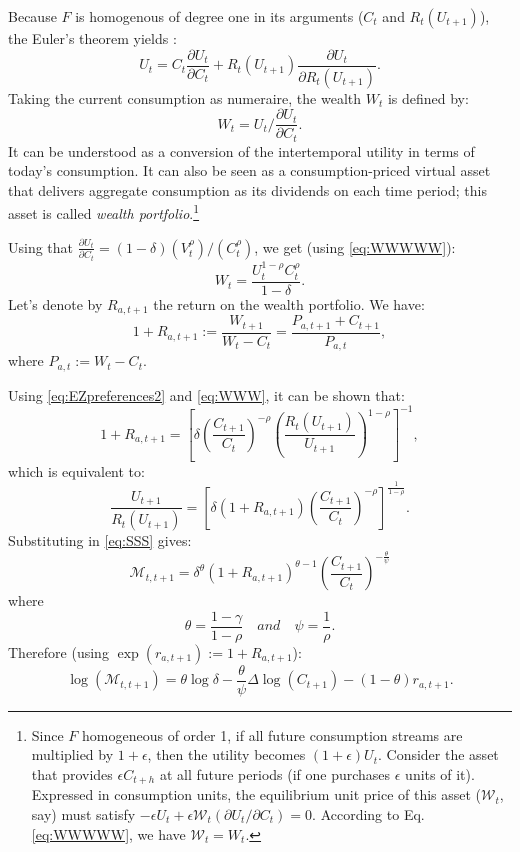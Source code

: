 \documentclass[
  12pt,
]{book}
\theoremstyle{definition}
\theoremstyle{definition}
\theoremstyle{definition}
\theoremstyle{definition}
\theoremstyle{remark}
\begin{document}
Because \(F\) is homogenous of degree one in its arguments (\(C_t\) and \(R_t(U_{t+1})\)), the Euler's theorem yields \citep{HANSEN20073967}:
\begin{equation}
U_t = C_t \frac{\partial U_t}{\partial C_t} +  R_t(U_{t+1}) \frac{\partial U_t}{\partial R_t(U_{t+1})}.\label{eq:XXYXX}
\end{equation}
Taking the current consumption as numeraire, the wealth \(W_t\) is defined by:
\begin{equation}
W_t =   U_t \big/ \frac{\partial U_t}{\partial C_t}.\label{eq:WWWWW}
\end{equation}
It can be understood as a conversion of the intertemporal utility in terms of today's consumption. It can also be seen as a consumption-priced virtual asset that delivers aggregate consumption as its dividends on each time period; this asset is called \emph{wealth portfolio}.\footnote{Since \(F\) homogeneous of order 1, if all future consumption streams are multiplied by \(1+\epsilon\), then the utility becomes \((1+\epsilon)U_t\). Consider the asset that provides \(\epsilon C_{t+h}\) at all future periods (if one purchases \(\epsilon\) units of it). Expressed in consumption units, the equilibrium unit price of this asset (\(\mathcal{W}_t\), say) must satisfy \(-\epsilon U_t + \epsilon \mathcal{W}_t (\partial U_t / \partial C_t)=0\). According to Eq. \eqref{eq:WWWWW}, we have \(\mathcal{W}_t = W_t\).}

Using that \(\frac{\partial U_t}{\partial C_t}=(1 - \delta)(V_t^\rho)/(C_t^{\rho})\), we get (using \eqref{eq:WWWWW}):
\begin{equation}
W_t = \frac{U_t^{1-\rho}C_t^\rho}{1 - \delta}.\label{eq:WWW}
\end{equation}
Let's denote by \(R_{a,t+1}\) the return on the wealth portfolio. We have:
\begin{equation}
1+R_{a,t+1} := \frac{W_{t+1}}{W_t - C_t} = \frac{P_{a,t+1}+C_{t+1}}{P_{a,t}},\label{eq:Ra}
\end{equation}
where \(P_{a,t} := W_t - C_t\).

Using \eqref{eq:EZpreferences2} and \eqref{eq:WWW}, it can be shown that:
\[
1+R_{a,t+1} = \left[ \delta \left( \frac{C_{t+1}}{C_t} \right)^{-\rho} \left( \frac{R_t(U_{t+1})}{U_{t+1}} \right)^{1-\rho} \right]^{-1},
\]
which is equivalent to:
\[
\frac{U_{t+1}}{R_t(U_{t+1})} = \left[ \delta (1+ R_{a,t+1}) \left( \frac{C_{t+1}}{C_t} \right)^{-\rho}  \right]^{\frac{1}{1-\rho}}.
\]
Substituting in \eqref{eq:SSS} gives:
\begin{equation}
\mathcal{M}_{t,t+1} =  \delta^{\theta} (1+R_{a,t+1})^{\theta - 1} \left( \frac{C_{t+1}}{C_t} \right)^{- \frac{\theta}{\psi}}
\end{equation}
where
\[
\theta = \frac{1-\gamma}{1-\rho} \quad and \quad \psi = \frac{1}{\rho}.
\]
Therefore (using \(\exp(r_{a,t+1}):=1+R_{a,t+1}\)):
\begin{equation}
\boxed{\log(\mathcal{M}_{t,t+1}) = \theta \log \delta - \frac{\theta}{\psi} \Delta \log(C_{t+1}) - (1-\theta) r_{a,t+1}.}\label{eq:sdfEZ}
\end{equation}
\end{document}
